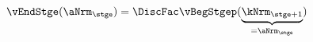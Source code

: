   \begin{equation}\begin{gathered}\begin{aligned}
\vEndStge(\aNrm_{\stge}) & = \DiscFac \vBegStgep(\underbrace{\kNrm_{\stge+1}}_{=\aNrm_{\stge}}) \label{eq:vEndStge}
      \end{aligned}\end{gathered}\end{equation}
